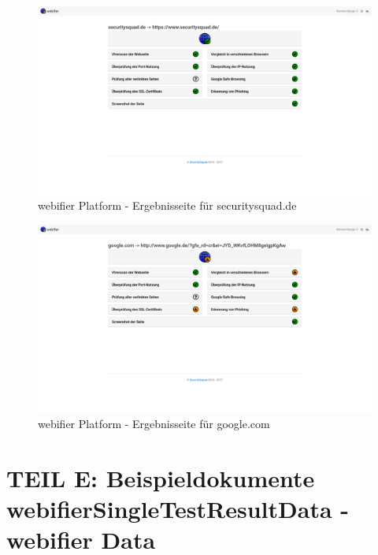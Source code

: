 \begin{landscape}
\begin{figure}[H]
  \centering
  \includegraphics[width=\textheight]{images/platform/screenshot-securitysquad}
  \caption{webifier Platform - Ergebnisseite für securitysquad.de}
  \label{fig:platform-result}
\end{figure}


\begin{figure}[H]
  \centering
  \includegraphics[width=\textheight]{images/platform/screenshot-google}
  \caption{webifier Platform - Ergebnisseite für google.com}
  \label{fig:platform-result}
\end{figure}


\end{landscape}

\newpage

\section*{TEIL E: Beispieldokumente webifierSingleTestResultData - webifier Data}
\label{app:e}

